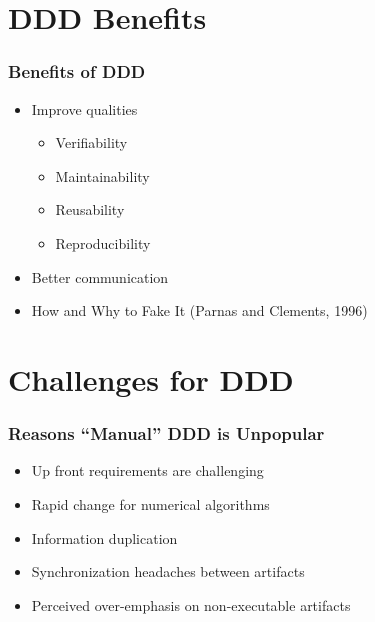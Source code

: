 \documentclass{beamer}
\begin{document}
\section[DDD Benefits]{DDD Benefits}


\begin{frame}

\frametitle{Benefits of DDD}

\begin{itemize}
\item Improve qualities
\begin{itemize}
\item Verifiability
\item Maintainability
\item Reusability
\item Reproducibility
\end{itemize}
\item Better communication
\item How and Why to Fake It (Parnas and Clements, 1996)
\end{itemize}
\end{frame}


\section[Challenges]{Challenges for DDD}


\begin{frame}

\frametitle{Reasons  ``Manual'' DDD is Unpopular}

\begin{itemize}
\item Up front requirements are challenging
\item Rapid change for numerical algorithms
\item Information duplication
\item Synchronization headaches between artifacts
\item Perceived over-emphasis on non-executable artifacts
\end{itemize}
\end{frame}
\end{document}
